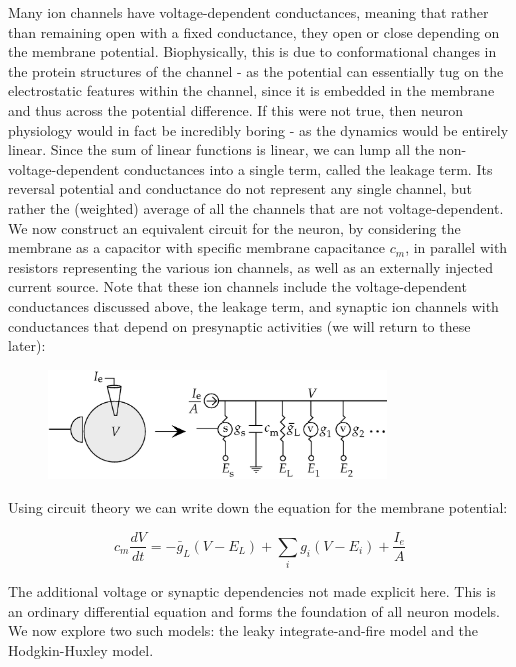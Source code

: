 \documentclass{article}
\begin{document}
Many ion channels have voltage-dependent conductances, meaning that rather than remaining open with a fixed conductance, they open or close depending on the membrane potential. Biophysically, this is due to conformational changes in the protein structures of the channel - as the potential can essentially tug on the electrostatic features within the channel, since it is embedded in the membrane and thus across the potential difference. If this were not true, then neuron physiology would in fact be incredibly boring - as the dynamics would be entirely linear. Since the sum of linear functions is linear, we can lump all the non-voltage-dependent conductances into a single term, called the leakage term. Its reversal potential and conductance do not represent any single channel, but rather the (weighted) average of all the channels that are not voltage-dependent.\\

We now construct an equivalent circuit for the neuron, by considering the membrane as a capacitor with specific membrane capacitance $c_m$, in parallel with resistors representing the various ion channels, as well as an externally injected current source. Note that these ion channels include the voltage-dependent conductances discussed above, the leakage term, and synaptic ion channels with conductances that depend on presynaptic activities (we will return to these later):

\begin{figure}[H]
	\centering
	\includegraphics[width=0.8\textwidth]{equivalent-circuit.png}
\end{figure}

Using circuit theory we can write down the equation for the membrane potential:

\begin{equation*}
    c_m \frac{dV}{dt} = -\bar{g}_L(V-E_L) + \sum_i g_i(V-E_i) + \frac{I_{e}}{A}
\end{equation*}

The additional voltage or synaptic dependencies not made explicit here. This is an ordinary differential equation and forms the foundation of all neuron models. We now explore two such models: the leaky integrate-and-fire model and the Hodgkin-Huxley model.\\
\end{document}
